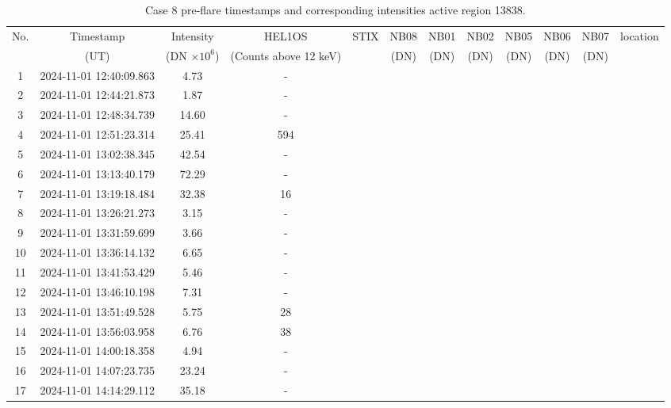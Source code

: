 \documentclass[fleqn,usenatbib]{mnras}
\begin{document}
\begin{table}
    \centering
    \caption{Case 8 pre-flare timestamps and corresponding intensities active region 13838.}
   \begin{tabular}{cccccccccccc}
        \hline
        No. & Timestamp & Intensity & HEL1OS & STIX & NB08 &NB01 & NB02 & NB05 & NB06 & NB07 & location\\
        &(UT) & (DN $\times 10^6$) & (Counts above 12 keV)& & (DN)& (DN)& (DN)& (DN)& (DN) & (DN)\\
        \hline
		1 & 2024-11-01 12:40:09.863 & 4.73   & - \\
		2 & 2024-11-01 12:44:21.873 & 1.87	& - \\
		3 & 2024-11-01 12:48:34.739 & 14.60	& - \\
		4 & 2024-11-01 12:51:23.314 & 25.41	& 594 \\
		5 & 2024-11-01 13:02:38.345 & 42.54	& - \\
		6 & 2024-11-01 13:13:40.179 & 72.29	& - \\
		7 & 2024-11-01 13:19:18.484 & 32.38	& 16 \\
		8 & 2024-11-01 13:26:21.273 & 3.15	& - \\
		9 & 2024-11-01 13:31:59.699 & 3.66	& - \\
		10 & 2024-11-01 13:36:14.132 & 6.65	& - \\
		11 & 2024-11-01 13:41:53.429 & 5.46	& - \\
		12 & 2024-11-01 13:46:10.198 & 7.31	& - \\
		13 & 2024-11-01 13:51:49.528 & 5.75	& 28 \\
		14 & 2024-11-01 13:56:03.958 & 6.76	& 38 \\
		15 & 2024-11-01 14:00:18.358 & 4.94	& - \\
		16 & 2024-11-01 14:07:23.735 & 23.24	& - \\
		17 & 2024-11-01 14:14:29.112 & 35.18	& - \\
        \hline
    \end{tabular}
\end{table}
\end{document}
